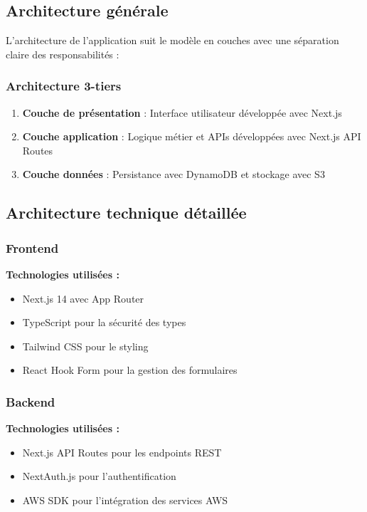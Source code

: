 \subsection{Architecture générale}

L'architecture de l'application suit le modèle en couches avec une séparation claire des responsabilités :

\subsubsection{Architecture 3-tiers}

\begin{enumerate}
    \item \textbf{Couche de présentation} : Interface utilisateur développée avec Next.js
    \item \textbf{Couche application} : Logique métier et APIs développées avec Next.js API Routes
    \item \textbf{Couche données} : Persistance avec DynamoDB et stockage avec S3
\end{enumerate}

\subsection{Architecture technique détaillée}

\subsubsection{Frontend}

\textbf{Technologies utilisées :}
\begin{itemize}
    \item Next.js 14 avec App Router
    \item TypeScript pour la sécurité des types
    \item Tailwind CSS pour le styling
    \item React Hook Form pour la gestion des formulaires
\end{itemize}

\subsubsection{Backend}

\textbf{Technologies utilisées :}
\begin{itemize}
    \item Next.js API Routes pour les endpoints REST
    \item NextAuth.js pour l'authentification
    \item AWS SDK pour l'intégration des services AWS
\end{itemize}

